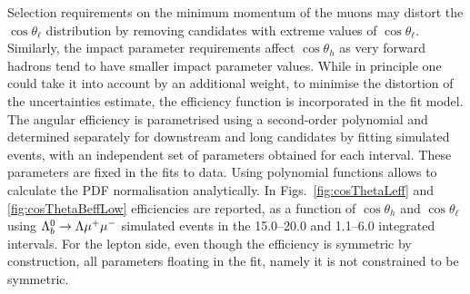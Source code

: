 Selection requirements on the minimum momentum of the muons may distort the $\cos \theta_\ell$ 
distribution by removing candidates with extreme values of $\cos\theta_\ell$. Similarly, 
the impact parameter requirements affect $\cos \theta_h$ as very forward hadrons tend
to have smaller impact parameter values. While in principle one could take it into account
by an additional weight, to minimise the distortion of the uncertainties estimate,
the efficiency function is incorporated in the fit model. The angular efficiency is
parametrised using a second-order polynomial and determined separately for downstream and
long candidates by fitting simulated events, with an independent set of parameters obtained
for each \qsq interval. These parameters are fixed in the fits to data.
Using polynomial functions allows to calculate the PDF normalisation analytically.
In Figs.~\ref{fig:cosThetaLeff} and \ref{fig:cosThetaBeffLow} efficiencies are reported,
as a function of $\cos\theta_h$ and $\cos\theta_\ell$ using $\Lambda^0_b\rightarrow\Lambda\mu^+\mu^-$ simulated events
in the 15.0--20.0 and 1.1--6.0 \gevgevcccc integrated \qsq intervals.
%
For the lepton side, even though the efficiency is symmetric by construction,
all parameters floating in the fit, namely it is not constrained to be symmetric.


